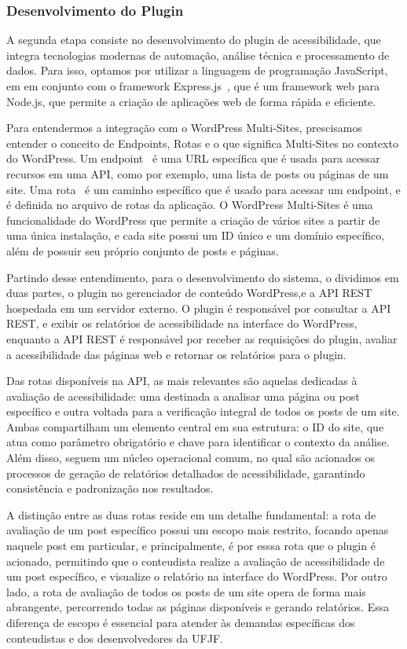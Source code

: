 \documentclass[12pt]{article}
\begin{document}
\subsubsection{Desenvolvimento do Plugin}
A segunda etapa consiste no desenvolvimento do plugin de acessibilidade, que
integra tecnologias modernas de automação, análise técnica e processamento de
dados. Para isso, optamos por utilizar a linguagem de programação JavaScript, em
em conjunto com o framework Express.js~\autocite{express}, que é um framework web
para Node.js, que permite a criação de aplicações web de forma rápida
e eficiente.

Para entendermos a integração com o WordPress Multi-Sites, prescisamos entender
o conceito de Endpoints, Rotas e o que significa Multi-Sites no contexto do WordPress.
Um endpoint~\autocite{endpoints} é uma URL específica que é usada para acessar
recursos em uma API, como por exemplo, uma lista de posts ou páginas de um site. Uma
rota~\autocite{routes} é um caminho específico que é usado para acessar um endpoint,
e é definida no arquivo de rotas da aplicação. O WordPress Multi-Sites é uma funcionalidade
do WordPress que permite a criação de vários sites a partir de uma única instalação,
e cada site possui um ID único e um domínio específico, além de possuir seu próprio
conjunto de posts e páginas.

Partindo desse entendimento, para o desenvolvimento do sistema, o
dividimos em duas partes, o plugin no gerenciador de conteúdo WordPress,e a
API REST hospedada em um servidor externo. O plugin é responsável por
consultar a API REST, e exibir os relatórios de acessibilidade na interface do
WordPress, enquanto a API REST é responsável por receber as requisições
do plugin, avaliar a acessibilidade das páginas web e retornar os relatórios
para o plugin.

Das rotas disponíveis na API, as mais relevantes são aquelas dedicadas
à avaliação de acessibilidade: uma destinada a analisar uma página ou post
específico e outra voltada para a verificação integral de todos os posts de um
site. Ambas compartilham um elemento central em sua estrutura: o ID do
site, que atua como parâmetro obrigatório e chave para identificar o contexto
da análise. Além disso, seguem um núcleo operacional comum, no qual são
acionados os processos de geração de relatórios detalhados de acessibilidade,
garantindo consistência e padronização nos resultados.

A distinção entre as duas rotas reside em um detalhe fundamental: a rota
de avaliação de um post específico possui um escopo mais restrito, focando
apenas naquele post em particular, e principalmente, é por esssa rota que 
o plugin é acionado, permitindo que o conteudista realize a avaliação de 
acessibilidade de um post específico, e visualize o relatório na interface do 
WordPress. Por outro lado, a rota de avaliação de todos os posts de um site
opera de forma mais abrangente, percorrendo todas as páginas disponíveis 
e gerando relatórios. Essa diferença de escopo é essencial para atender às 
demandas específicas dos conteudistas e dos desenvolvedores da UFJF.
\bigbreak
\end{document}
